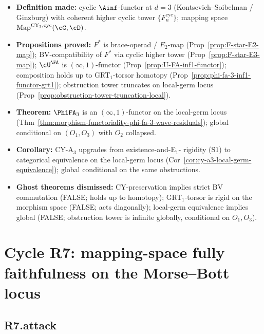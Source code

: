\begin{itemize}
\item \textbf{Definition made:} cyclic $\Ainf$-functor at $d = 3$
      (Kontsevich--Soibelman / Ginzburg) with coherent higher cyclic
      tower $\{F_n^{\mathrm{cyc}}\}$; mapping space
      $\mathrm{Map}^{\mathrm{CY}_3,\mathrm{cyc}}(\cC, \cD)$.
\item \textbf{Propositions proved:}
      $F^*$ is brace-operad / $E_2$-map
      (Prop~\ref{prop:F-star-E2-map}); BV-compatibility of $F^*$ via
      cyclic higher tower (Prop~\ref{prop:F-star-E3-map}); $\cU^\FA$
      is $(\infty,1)$-functor (Prop~\ref{prop:U-FA-inf1-functor});
      composition holds up to GRT$_1$-torsor homotopy
      (Prop~\ref{prop:phi-fa-3-inf1-functor-grt1}); obstruction tower
      truncates on local-germ locus
      (Prop~\ref{prop:obstruction-tower-truncation-local}).
\item \textbf{Theorem:} $\PhiFA_3$ is an $(\infty,1)$-functor on the
      local-germ locus (Thm~\ref{thm:morphism-functoriality-phi-fa-3-wave-residuals});
      global conditional on $(O_1, O_3)$ with $O_2$ collapsed.
\item \textbf{Corollary:} CY-A$_3$ upgrades from existence-and-E$_1$-
      rigidity (S$1$) to categorical equivalence on the local-germ
      locus (Cor~\ref{cor:cy-a3-local-germ-equivalence}); global
      conditional on the same obstructions.
\item \textbf{Ghost theorems dismissed:} CY-preservation implies
      strict BV commutation (FALSE; holds up to homotopy);
      GRT$_1$-torsor is rigid on the morphism space (FALSE; acts
      diagonally); local-germ equivalence implies global (FALSE;
      obstruction tower is infinite globally, conditional on $O_1,
      O_3$).
\end{itemize}

\section*{Cycle R7: mapping-space fully faithfulness on the Morse--Bott locus}

\subsection*{R7.attack}

